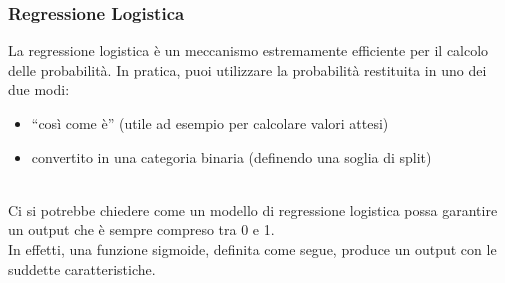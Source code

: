 \begin{frame}
	
	\frametitle{Regressione Logistica}
	
	La regressione logistica è un meccanismo estremamente efficiente per il calcolo delle probabilità.
	\newlinedouble
	In pratica, puoi utilizzare la probabilità restituita in uno dei due modi:
	\begin{itemize}
		\item ``così come è'' (utile ad esempio per calcolare valori attesi)
		\item convertito in una categoria binaria (definendo una soglia di split)
	\end{itemize}
	\ \\
	Ci si potrebbe chiedere come un modello di regressione logistica possa garantire un output che è sempre compreso tra 0 e 1.\\
	In effetti, una funzione sigmoide, definita come segue, produce un output con le suddette caratteristiche.


\end{frame}


